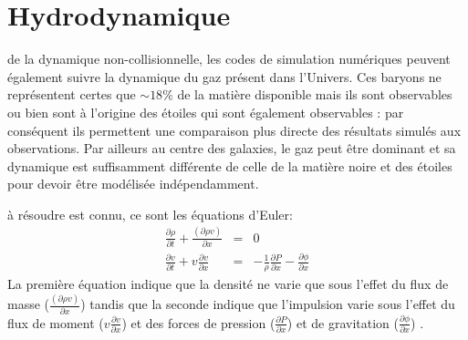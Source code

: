 \section{Hydrodynamique}
 de la dynamique non-collisionnelle, les codes de simulation numériques peuvent également suivre la dynamique du gaz présent dans l'Univers. Ces baryons ne représentent certes que $\sim 18\%$ de la matière disponible mais ils sont observables ou bien sont à l'origine des étoiles qui sont également observables : par conséquent ils permettent une comparaison plus directe des résultats simulés aux observations. Par ailleurs au centre des galaxies, le gaz peut être dominant et sa dynamique est suffisamment différente de celle de la matière noire et des étoiles pour devoir être modélisée indépendamment.

 à résoudre est connu, ce sont les équations d'Euler:
\begin{eqnarray}
\frac{\partial \rho}{\partial t}+\frac{(\partial \rho v)}{\partial x}&=&0\\
\frac{\partial v}{\partial t} + v \frac{\partial v}{\partial x}&=&-\frac{1}{\rho}\frac{\partial P}{\partial x}-\frac{\partial \phi}{\partial x}
\end{eqnarray}
La première équation indique que la densité ne varie que sous l'effet du flux de masse ($\frac{(\partial \rho v)}{\partial x}$) tandis que la seconde indique que l'impulsion varie sous l'effet du flux de moment ($ v \frac{\partial v}{\partial x}$) et des forces de pression ($\frac{\partial P}{\partial x}$)  et de gravitation ($\frac{\partial \phi}{\partial x}$) .

